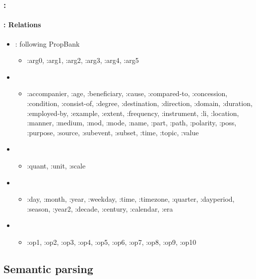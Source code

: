 \documentclass[xcolor=table]{beamer}
\begin{document}
\begin{frame}[fragile]
	\frametitle{\insertshortsubtitle: \insertsection}
	\framesubtitle{\insertsubsection: Relations}
	
	\begin{itemize}
		\item {}: following PropBank
		\begin{itemize}
			\item :arg0, :arg1, :arg2, :arg3, :arg4, :arg5
		\end{itemize}
		\item {}
		\begin{itemize}
			\item :accompanier, :age, :beneficiary, :cause, :compared-to, :concession, :condition, :consist-of, :degree, :destination, :direction, :domain, :duration, :employed-by, :example, :extent, :frequency, :instrument, :li, :location, :manner, :medium, :mod, :mode, :name, :part, :path, :polarity, :poss, :purpose, :source, :subevent, :subset, :time, :topic, :value
		\end{itemize}
		\item {}
		\begin{itemize}
			\item :quant, :unit, :scale
		\end{itemize}
		\item {}
		\begin{itemize}
			\item :day, :month,
			:year, :weekday, :time, :timezone, :quarter,
			:dayperiod, :season, :year2, :decade, :century,
			:calendar, :era
		\end{itemize}
		\item {}
		\begin{itemize}
			\item :op1, :op2, :op3, :op4, :op5,
			:op6, :op7, :op8, :op9, :op10
		\end{itemize}
	\end{itemize}
	
\end{frame}


\subsection{Semantic parsing}
\end{document}

